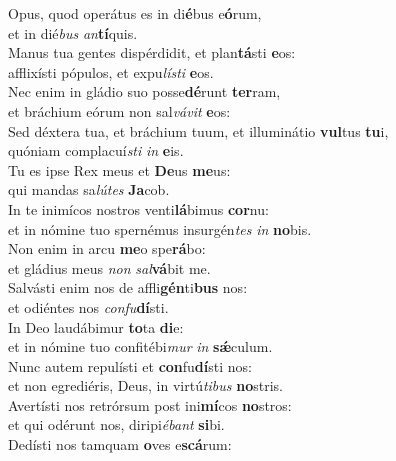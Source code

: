 \evenverse Opus, quod operátus es in di\textbf{é}bus e\textbf{ó}rum,~\*\\
\evenverse et in dié\textit{bus} \textit{an}\textbf{tí}quis.\\
\oddverse Manus tua gentes dispérdidit, et plan\textbf{tá}sti \textbf{e}os:~\*\\
\oddverse afflixísti pópulos, et expu\textit{lí}\textit{sti} \textbf{e}os.\\
\evenverse Nec enim in gládio suo posse\textbf{dé}runt \textbf{ter}ram,~\*\\
\evenverse et bráchium eórum non sal\textit{vá}\textit{vit} \textbf{e}os:\\
\oddverse Sed déxtera tua, et bráchium tuum, et illuminátio \textbf{vul}tus \textbf{tu}i,~\*\\
\oddverse quóniam complacuí\textit{sti} \textit{in} \textbf{e}is.\\
\evenverse Tu es ipse Rex meus et \textbf{De}us \textbf{me}us:~\*\\
\evenverse qui mandas sa\textit{lú}\textit{tes} \textbf{Ja}cob.\\
\oddverse In te inimícos nostros venti\textbf{lá}bimus \textbf{cor}nu:~\*\\
\oddverse et in nómine tuo spernémus insurgén\textit{tes} \textit{in} \textbf{no}bis.\\
\evenverse Non enim in arcu \textbf{me}o spe\textbf{rá}bo:~\*\\
\evenverse et gládius meus \textit{non} \textit{sal}\textbf{vá}bit me.\\
\oddverse Salvásti enim nos de affli\textbf{gén}ti\textbf{bus} nos:~\*\\
\oddverse et odiéntes nos \textit{con}\textit{fu}\textbf{dí}sti.\\
\evenverse In Deo laudábimur \textbf{to}ta \textbf{di}e:~\*\\
\evenverse et in nómine tuo confitébi\textit{mur} \textit{in} \textbf{sǽ}culum.\\
\oddverse Nunc autem repulísti et \textbf{con}fu\textbf{dí}sti nos:~\*\\
\oddverse et non egrediéris, Deus, in virtú\textit{ti}\textit{bus} \textbf{no}stris.\\
\evenverse Avertísti nos retrórsum post ini\textbf{mí}cos \textbf{no}stros:~\*\\
\evenverse et qui odérunt nos, diripi\textit{é}\textit{bant} \textbf{si}bi.\\
\oddverse Dedísti nos tamquam \textbf{o}ves e\textbf{scá}rum:~\*\\

